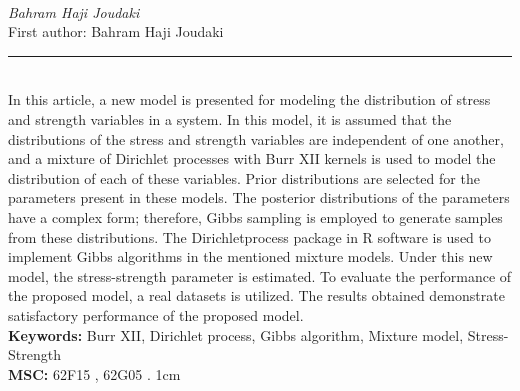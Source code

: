 \documentclass[10pt,twoside]{article}
\begin{document}
\noindent\begin{minipage}[t][\textheight]{\textwidth}
\\[0.35em]
{\itshape Bahram Haji Joudaki}\\[0.2em]
{\footnotesize First author: Bahram Haji Joudaki}\\[0.45em]
\noindent\rule{\textwidth}{0.3pt}\\[0.4em]
{\footnotesize  In this article, a new model is presented for modeling the distribution of stress and strength variables in a system. In this model, it is assumed that the distributions of the stress and strength variables are independent of one another, and a mixture of Dirichlet processes with Burr XII kernels is used to model the distribution of each of these variables. Prior distributions are selected for the parameters present in these models. The posterior distributions of the parameters have a complex form; therefore, Gibbs sampling is employed to generate samples from these distributions. The Dirichletprocess package in R software is used to implement Gibbs algorithms in the mentioned mixture models. Under this new model, the stress-strength parameter is estimated. To evaluate the performance of the proposed model, a real datasets is utilized. The results obtained demonstrate satisfactory performance of the proposed model.}\\[0.4em]
{\footnotesize\bfseries Keywords:} {\footnotesize Burr XII, Dirichlet process, Gibbs algorithm, Mixture model, Stress-Strength}\\[0.15em]
{\footnotesize\bfseries MSC:} {\footnotesize 62F15 , 62G05 . 1cm}\\
\vfill
\end{minipage}
\newpage
\end{document}
